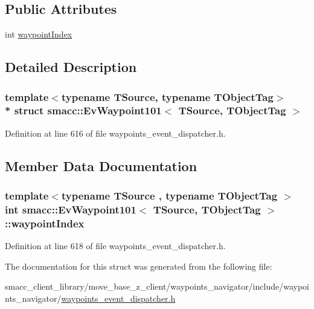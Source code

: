 \subsection*{Public Attributes}
\begin{DoxyCompactItemize}
\item 
int \hyperlink{structsmacc_1_1EvWaypoint101_a473db2af979d92b862c3f1fbee7c42ed}{waypoint\+Index}
\end{DoxyCompactItemize}


\subsection{Detailed Description}
\subsubsection*{template$<$typename T\+Source, typename T\+Object\+Tag$>$\\*
struct smacc\+::\+Ev\+Waypoint101$<$ T\+Source, T\+Object\+Tag $>$}



Definition at line 616 of file waypoints\+\_\+event\+\_\+dispatcher.\+h.



\subsection{Member Data Documentation}
\subsubsection[{\texorpdfstring{waypoint\+Index}{waypointIndex}}]{\setlength{\rightskip}{0pt plus 5cm}template$<$typename T\+Source , typename T\+Object\+Tag $>$ int {\bf smacc\+::\+Ev\+Waypoint101}$<$ T\+Source, T\+Object\+Tag $>$\+::waypoint\+Index}\hypertarget{structsmacc_1_1EvWaypoint101_a473db2af979d92b862c3f1fbee7c42ed}{}\label{structsmacc_1_1EvWaypoint101_a473db2af979d92b862c3f1fbee7c42ed}


Definition at line 618 of file waypoints\+\_\+event\+\_\+dispatcher.\+h.



The documentation for this struct was generated from the following file\+:\begin{DoxyCompactItemize}
\item 
smacc\+\_\+client\+\_\+library/move\+\_\+base\+\_\+z\+\_\+client/waypoints\+\_\+navigator/include/waypoints\+\_\+navigator/\hyperlink{waypoints__event__dispatcher_8h}{waypoints\+\_\+event\+\_\+dispatcher.\+h}\end{DoxyCompactItemize}
